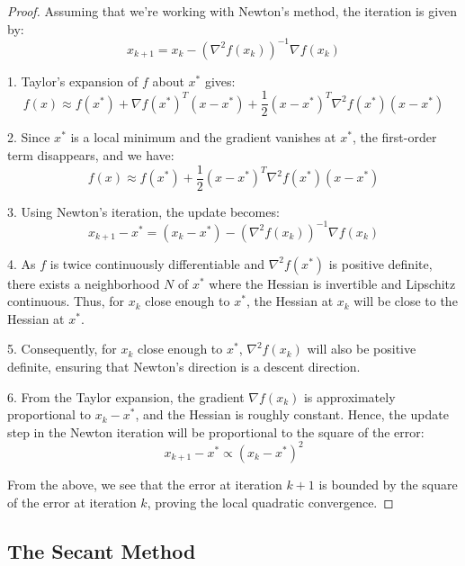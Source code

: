 \begin{proof}
Assuming that we're working with Newton's method, the iteration is given by:
\[
x_{k+1} = x_k - \left( \nabla^2 f(x_k) \right)^{-1} \nabla f(x_k)
\]

1. Taylor's expansion of $ f $ about $ x^* $ gives:
\[
f(x) \approx f(x^*) + \nabla f(x^*)^T (x - x^*) + \frac{1}{2} (x - x^*)^T \nabla^2 f(x^*) (x - x^*)
\]

2. Since $ x^* $ is a local minimum and the gradient vanishes at $ x^* $, the first-order term disappears, and we have:
\[
f(x) \approx f(x^*) + \frac{1}{2} (x - x^*)^T \nabla^2 f(x^*) (x - x^*)
\]

3. Using Newton's iteration, the update becomes:
\[
x_{k+1} - x^* = (x_k - x^*) - \left( \nabla^2 f(x_k) \right)^{-1} \nabla f(x_k)
\]

4. As $ f $ is twice continuously differentiable and $ \nabla^2 f(x^*) $ is positive definite, there exists a neighborhood $ N $ of $ x^* $ where the Hessian is invertible and Lipschitz continuous. Thus, for $ x_k $ close enough to $ x^* $, the Hessian at $ x_k $ will be close to the Hessian at $ x^* $.

5. Consequently, for $ x_k $ close enough to $ x^* $, $ \nabla^2 f(x_k) $ will also be positive definite, ensuring that Newton's direction is a descent direction.

6. From the Taylor expansion, the gradient $ \nabla f(x_k) $ is approximately proportional to $ x_k - x^* $, and the Hessian is roughly constant. Hence, the update step in the Newton iteration will be proportional to the square of the error:
\[
x_{k+1} - x^* \propto (x_k - x^*)^2
\]

From the above, we see that the error at iteration $ k+1 $ is bounded by the square of the error at iteration $ k $, proving the local quadratic convergence.
\end{proof}



\subsection*{The Secant Method} %


